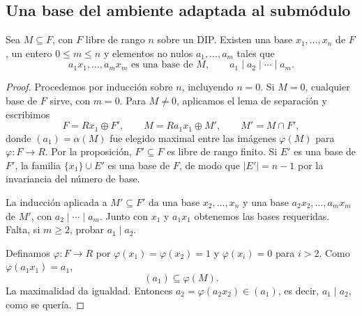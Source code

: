 \subsection{Una base del ambiente adaptada al submódulo}
\begin{coro}\label{coro:C21-bases-compatibles}
Sea $M\subseteq F$, con $F$ libre de rango $n$ sobre un DIP. Existen una base $x_1,\ldots,x_n$ de $F$, un entero $0\leq m\leq n$ y elementos no nulos $a_1,\ldots,a_m$ tales que
\[
a_1x_1,\ldots,a_mx_m\text{ es una base de }M,
\qquad a_1\mid a_2\mid\cdots\mid a_m.
\]
\end{coro}
\begin{proof}
Procedemos por inducción sobre $n$, incluyendo $n=0$. Si $M=0$, cualquier base de $F$ sirve, con $m=0$. Para $M\ne0$, aplicamos el lema de separación y escribimos
\[
F=Rx_1\oplus F',\qquad M=Ra_1x_1\oplus M',\qquad
M'=M\cap F',
\]
donde $(a_1)=\alpha(M)$ fue elegido maximal entre las imágenes $\varphi(M)$ para $\varphi:F\to R$. Por la proposición, $F'\subseteq F$ es libre de rango finito. Si $E'$ es una base de $F'$, la familia $\{x_1\}\cup E'$ es una base de $F$, de modo que $|E'|=n-1$ por la invariancia del número de base.

La inducción aplicada a $M'\subseteq F'$ da una base $x_2,\ldots,x_n$ y una base $a_2x_2,\ldots,a_mx_m$ de $M'$, con $a_2\mid\cdots\mid a_m$. Junto con $x_1$ y $a_1x_1$ obtenemos las bases requeridas. Falta, si $m\geq2$, probar $a_1\mid a_2$.

Definamos $\varphi:F\to R$ por $\varphi(x_1)=\varphi(x_2)=1$ y $\varphi(x_i)=0$ para $i>2$. Como $\varphi(a_1x_1)=a_1$,
\[
(a_1)\subseteq\varphi(M).
\]
La maximalidad da igualdad. Entonces $a_2=\varphi(a_2x_2)\in(a_1)$, es decir, $a_1\mid a_2$, como se quería.
\end{proof}

